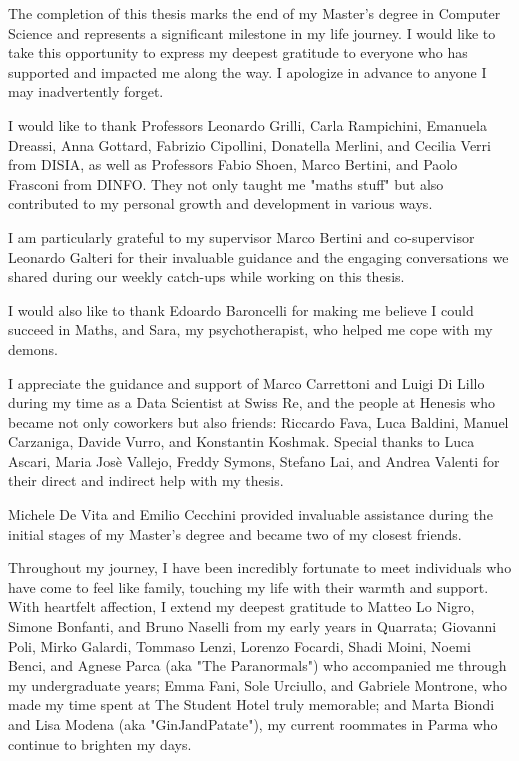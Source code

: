 \label{chap:Acknowledgements}

The completion of this thesis marks the end of my Master's degree in Computer Science and represents a significant milestone in my life journey. I would like to take this opportunity to express my deepest gratitude to everyone who has supported and impacted me along the way. I apologize in advance to anyone I may inadvertently forget.

I would like to thank Professors Leonardo Grilli, Carla Rampichini, Emanuela Dreassi, Anna Gottard, Fabrizio Cipollini, Donatella Merlini, and Cecilia Verri from DISIA, as well as Professors Fabio Shoen, Marco Bertini, and Paolo Frasconi from DINFO. They not only taught me "maths stuff" but also contributed to my personal growth and development in various ways.

I am particularly grateful to my supervisor Marco Bertini and co-supervisor Leonardo Galteri for their invaluable guidance and the engaging conversations we shared during our weekly catch-ups while working on this thesis.

I would also like to thank Edoardo Baroncelli for making me believe I could succeed in Maths, and Sara, my psychotherapist, who helped me cope with my demons.

I appreciate the guidance and support of Marco Carrettoni and Luigi Di Lillo during my time as a Data Scientist at Swiss Re, and the people at Henesis who became not only coworkers but also friends: Riccardo Fava, Luca Baldini, Manuel Carzaniga, Davide Vurro, and Konstantin Koshmak. Special thanks to Luca Ascari, Maria Josè Vallejo, Freddy Symons, Stefano Lai, and Andrea Valenti for their direct and indirect help with my thesis.

Michele De Vita and Emilio Cecchini provided invaluable assistance during the initial stages of my Master's degree and became two of my closest friends.

Throughout my journey, I have been incredibly fortunate to meet individuals who have come to feel like family, touching my life with their warmth and support. With heartfelt affection, I extend my deepest gratitude to Matteo Lo Nigro, Simone Bonfanti, and Bruno Naselli from my early years in Quarrata; Giovanni Poli, Mirko Galardi, Tommaso Lenzi, Lorenzo Focardi, Shadi Moini, Noemi Benci, and Agnese Parca (aka "The Paranormals") who accompanied me through my undergraduate years; Emma Fani, Sole Urciullo, and Gabriele Montrone, who made my time spent at The Student Hotel truly memorable; and Marta Biondi and Lisa Modena (aka "GinJandPatate"), my current roommates in Parma who continue to brighten my days.

